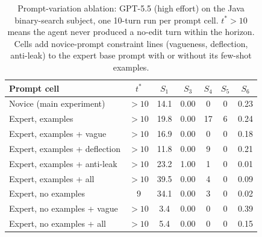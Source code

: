 \begin{table}[t]
\centering
\caption{Prompt-variation ablation: GPT-5.5 (high effort) on the Java binary-search subject, one 10-turn run per prompt cell. $t^{*}>10$ means the agent never produced a no-edit turn within the horizon. Cells add novice-prompt constraint lines (vagueness, deflection, anti-leak) to the expert base prompt with or without its few-shot examples.}
\label{tab:app-prompt}
\small
\begin{tabular}{lcccccc}
\toprule
Prompt cell & $t^{*}$ & $S_1$ & $S_3$ & $S_4$ & $S_5$ & $S_6$ \\
\midrule
Novice (main experiment) & $>10$ & 14.1 & 0.00 & 0 & 0 & 0.23 \\
\midrule
Expert, examples & $>10$ & 19.8 & 0.00 & 17 & 6 & 0.24 \\
Expert, examples + vague & $>10$ & 16.9 & 0.00 & 0 & 0 & 0.18 \\
Expert, examples + deflection & $>10$ & 11.8 & 0.00 & 9 & 0 & 0.21 \\
Expert, examples + anti-leak & $>10$ & 23.2 & 1.00 & 1 & 0 & 0.01 \\
Expert, examples + all & $>10$ & 39.5 & 0.00 & 4 & 0 & 0.09 \\
Expert, no examples & 9 & 34.1 & 0.00 & 3 & 0 & 0.02 \\
Expert, no examples + vague & $>10$ & 3.4 & 0.00 & 0 & 0 & 0.39 \\
Expert, no examples + all & $>10$ & 5.4 & 0.00 & 0 & 0 & 0.15 \\
\bottomrule
\end{tabular}
\end{table}
